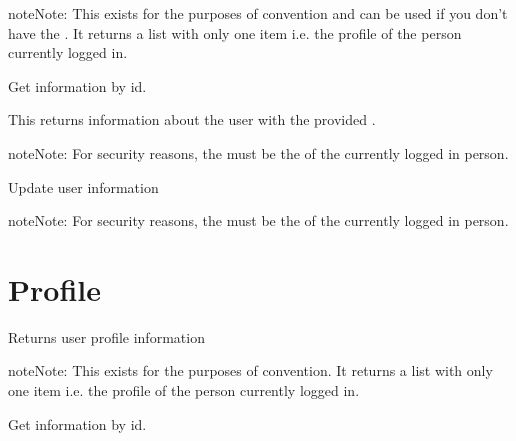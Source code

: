 \documentclass[letterpaper,10pt,english]{sphinxmanual}
\begin{document}
\begin{notice}{note}{Note:}
This exists for the purposes of convention and can be used if you don't have the .
It returns a list with only one item i.e. the profile of the person currently logged in.
\end{notice}

Get information by id.


\begin{fulllineitems}
\label{accounts:get--api-v1-profile-_id_-}
\end{fulllineitems}


This returns information about the user with the provided .

\begin{notice}{note}{Note:}
For security reasons, the  must be the  of the currently logged in person.
\end{notice}

Update user information


\begin{fulllineitems}
\label{accounts:put--api-v1-user-_id_-}
\end{fulllineitems}


\begin{notice}{note}{Note:}
For security reasons, the  must be the  of the currently logged in person.
\end{notice}


\section{Profile}
\label{accounts:profile}
Returns user profile information


\begin{fulllineitems}
\label{accounts:get--api-v1-profile-}
\end{fulllineitems}


\begin{notice}{note}{Note:}
This exists for the purposes of convention. It returns a list with only one item i.e.
the profile of the person currently logged in.
\end{notice}

Get information by id.


\begin{fulllineitems}
\label{accounts:get--api-v1-profile-_id_-}
\end{fulllineitems}
\end{document}
